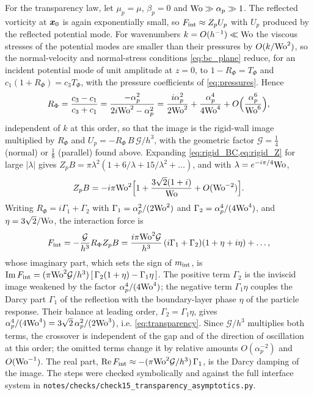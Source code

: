 For the transparency law, let $\mu_p=\mu$, $\beta_p=0$ and $\mathrm{Wo}\gg\alpha_p\gg1$. The reflected vorticity at $\bm{x}_0$ is
again exponentially small, so $F_{\rm int}\approx Z_pU_p$ with $U_p$ produced by the reflected potential mode. For
wavenumbers $k=O(h^{-1})\ll\mathrm{Wo}$ the viscous stresses of the potential modes are smaller than their pressures by
$O(k/\mathrm{Wo}^2)$, so the normal-velocity and normal-stress conditions \cref{eq:bc_plane} reduce, for an incident potential
mode of unit amplitude at $z=0$, to $1-R_\Phi=T_\Phi$ and $c_1(1+R_\Phi)=c_3T_\Phi$, with the pressure coefficients of
\cref{eq:pressures}. Hence
\begin{equation*}
  R_\Phi=\frac{c_3-c_1}{c_3+c_1}=\frac{-\alpha_p^2}{2i\mathrm{Wo}^2-\alpha_p^2}
  =\frac{i\alpha_p^2}{2\mathrm{Wo}^2}+\frac{\alpha_p^4}{4\mathrm{Wo}^4}+O\Bigl(\frac{\alpha_p^6}{\mathrm{Wo}^6}\Bigr),
\end{equation*}
independent of $k$ at this order, so that the image is the rigid-wall image multiplied by $R_\Phi$ and
$U_p=-R_\Phi\,B\,\mathcal G/h^3$, with the geometric factor $\mathcal G=\tfrac14$ (normal) or $\tfrac18$ (parallel) found above. Expanding
\cref{eq:rigid_BC,eq:rigid_Z} for large $|\lambda|$ gives
$Z_pB=\pi\lambda^2(1+6/\lambda+15/\lambda^2+\dots)$, and with $\lambda=e^{-i\pi/4}\mathrm{Wo}$,
\begin{equation*}
  Z_pB=-i\pi\mathrm{Wo}^2\Bigl[1+\frac{3\sqrt2(1+i)}{\mathrm{Wo}}+O(\mathrm{Wo}^{-2})\Bigr].
\end{equation*}
Writing $R_\Phi=i\Gamma_1+\Gamma_2$ with $\Gamma_1=\alpha_p^2/(2\mathrm{Wo}^2)$ and $\Gamma_2=\alpha_p^4/(4\mathrm{Wo}^4)$, and $\eta=3\sqrt2/\mathrm{Wo}$, the interaction
force is
\begin{equation*}
  F_{\rm int}=-\frac{\mathcal G}{h^3}R_\Phi Z_pB
  =\frac{i\pi\mathrm{Wo}^2\mathcal G}{h^3}\,(i\Gamma_1+\Gamma_2)(1+\eta+i\eta)+\dots,
\end{equation*}
whose imaginary part, which sets the sign of $m_{\rm int}$, is
$\operatorname{Im}F_{\rm int}=(\pi\mathrm{Wo}^2\mathcal G/h^3)\,[\,\Gamma_2(1+\eta)-\Gamma_1\eta\,]$. The positive term $\Gamma_2$ is the inviscid image weakened by
the factor $\alpha_p^4/(4\mathrm{Wo}^4)$; the negative term $\Gamma_1\eta$ couples the Darcy part $\Gamma_1$ of the reflection with the
boundary-layer phase $\eta$ of the particle response. Their balance at leading order, $\Gamma_2=\Gamma_1\eta$, gives
$\alpha_p^4/(4\mathrm{Wo}^4)=3\sqrt2\,\alpha_p^2/(2\mathrm{Wo}^3)$, i.e. \cref{eq:transparency}. Since $\mathcal G/h^3$ multiplies both terms,
the crossover is independent of the gap and of the direction of oscillation at this order; the omitted terms change it by
relative amounts $O(\alpha_p^{-2})$ and $O(\mathrm{Wo}^{-1})$. The real part, $\operatorname{Re}F_{\rm int}\approx
-(\pi\mathrm{Wo}^2\mathcal G/h^3)\,\Gamma_1$, is the Darcy damping of the image. The steps were checked symbolically and against the full
interface system in \texttt{notes/checks/check15\_transparency\_asymptotics.py}.

